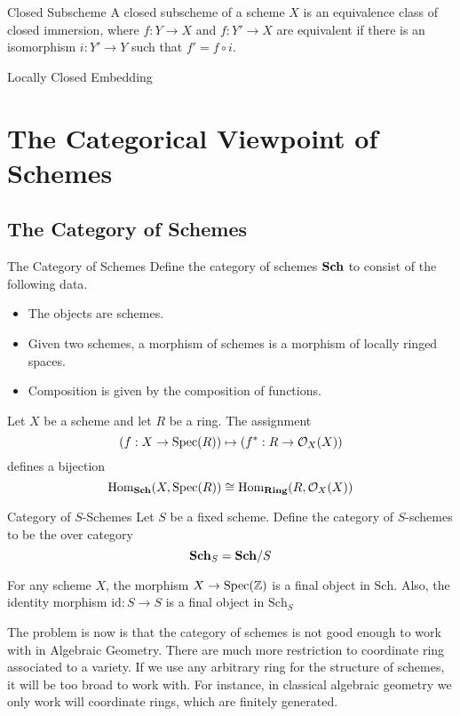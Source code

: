 \documentclass[a4paper]{article}
\begin{document}
\begin{defn}{Closed Subscheme}{} A closed subscheme of a scheme $X$ is an equivalence class of closed immersion, where $f:Y\to X$ and $f:Y'\to X$ are equivalent if there is an isomorphism $i:Y'\to Y$ such that $f'=f\circ i$. 
\end{defn}

\begin{defn}{Locally Closed Embedding}{}
\end{defn}

\pagebreak
\section{The Categorical Viewpoint of Schemes}
\subsection{The Category of Schemes}
\begin{defn}{The Category of Schemes}{} Define the category of schemes $\bold{Sch}$ to consist of the following data. 
\begin{itemize}
\item The objects are schemes. 
\item Given two schemes, a morphism of schemes is a morphism of locally ringed spaces. 
\item Composition is given by the composition of functions. 
\end{itemize}
\end{defn}

\begin{thm}{}{} Let $X$ be a scheme and let $R$ be a ring. The assignment $$\left(f:X\to\text{Spec}(R)\right)\mapsto\left(f^\ast:R\to\mathcal{O}_X(X)\right)$$ defines a bijection $$\operatorname{Hom}_{\bold{Sch}}(X,\text{Spec}(R))\cong\operatorname{Hom}_\bold{Ring}(R,\mathcal{O}_X(X))$$
\end{thm}

\begin{defn}{Category of $S$-Schemes}{} Let $S$ be a fixed scheme. Define the category of $S$-schemes to be the over category $$\bold{Sch}_S=\bold{Sch}/S$$
\end{defn}

\begin{lmm}{}{} For any scheme $X$, the morphism $X\to\text{Spec}(\mathbb{Z})$ is a final object in $\text{Sch}$. Also, the identity morphism $\text{id}:S\to S$ is a final object in $\text{Sch}_S$
\end{lmm}

The problem is now is that the category of schemes is not good enough to work with in Algebraic Geometry. There are much more restriction to coordinate ring associated to a variety. If we use any arbitrary ring for the structure of schemes, it will be too broad to work with. For instance, in classical algebraic geometry we only work will coordinate rings, which are finitely generated. 
\end{document}

